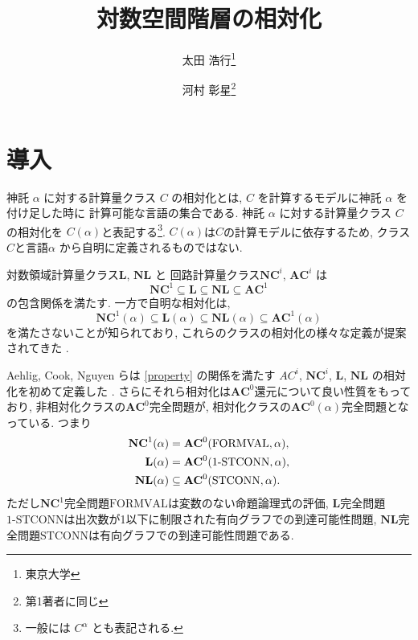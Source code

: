 \documentclass[10pt,a4paper,twocolumn]{jarticle}
\title{対数空間階層の相対化}
\author{太田 浩行\thanks{東京大学} \and
河村 彰星\thanks{第1著者に同じ}
}
\date{}
\theoremstyle{definition}
\theoremstyle{remark}
\newcommand{\classfont}{\mathbf}
\newcommand{\AC}{\classfont{AC}}
\newcommand{\NC}{\classfont{NC}}
\renewcommand{\L}{\classfont{L}}
\newcommand{\NL}{\classfont{NL}}
\newcommand{\probfont}{\text}
\newcommand{\oneSTCONN}{\probfont{1-STCONN}}
\newcommand{\STCONN}{\probfont{STCONN}}
\newcommand{\FORMVAL}{\probfont{FORMVAL}}
\begin{document}
\maketitle\thispagestyle{LAtitleheadings}



\section{導入}
神託 $\alpha$ に対する計算量クラス $C$ の相対化とは,
$C$ を計算するモデルに神託 $\alpha$ を付け足した時に
計算可能な言語の集合である.
神託 $\alpha$ に対する計算量クラス $C$ の相対化を
$C(\alpha)$と表記する\footnote{一般には $C^\alpha$ とも表記される.}.
$C(\alpha)$は$C$の計算モデルに依存するため, クラス$C$と言語$\alpha$
から自明に定義されるものではない.

対数領域計算量クラス$\L$, $\NL$ と
回路計算量クラス$\NC^i$, $\AC^i$ は
\begin{equation*}
 \NC^1 \subseteq \L \subseteq \NL \subseteq \AC^1
\end{equation*}
の包含関係を満たす.
一方で自明な相対化は,
\begin{equation}
 \NC^1(\alpha) \subseteq \L(\alpha) \subseteq \NL(\alpha) \subseteq \AC^1(\alpha) \label{property}
\end{equation}
を満たさないことが知られており,
これらのクラスの相対化の様々な定義が提案されてきた
\cite{aehlig2007relativizing,buss1988relativized,ladner1976relativization,wilson1988measure}.


Aehlig, Cook, Nguyen らは \eqref{property} の関係を満たす
$AC^i$, $\NC^i$, $\L$, $\NL$ の相対化を初めて定義した
\cite{aehlig2007relativizing}.
さらにそれら相対化は$\AC^0$還元について良い性質をもっており,
非相対化クラスの$\AC^0$完全問題が,
相対化クラスの$\AC^0(\alpha)$完全問題となっている. つまり
\begin{align}
 \NC^1(\alpha) &= \AC^0 (\FORMVAL, \alpha), \notag
 \\
 \L(\alpha) &= \AC^0 (\oneSTCONN, \alpha), \label{eq:nl-in-ac0-stconn}
 \\
 \NL(\alpha) &\subseteq \AC^0(\STCONN, \alpha). \notag
\end{align}
ただし$\NC^1$完全問題$\FORMVAL$は変数のない命題論理式の評価,
$\L$完全問題$\oneSTCONN$は出次数が1以下に制限された有向グラフでの到達可能性問題,
$\NL$完全問題$\STCONN$は有向グラフでの到達可能性問題である.
\end{document}
